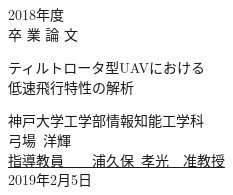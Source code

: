 \newcommand{\hdate}[1]{\setcounter{page}{0}\begin{center}{\LARGE
#1\\}\vskip 20pt {\Huge 卒 業 論 文}\end{center}\vskip 40pt}

\newcommand{\htitle}[1]{
        \begin{center}
                \vskip 16pt
                {\LARGE #1}\\
                \setlength{\unitlength}{1mm}
        \end{center}
        \vskip 40pt
}

\begin{titlepage}
\vspace*{2cm}
\hdate{2018年度}
\htitle{ティルトロータ型UAVにおける\\低速飛行特性の解析}

\hspace{8cm}
\begin{center}
\Large
神戸大学工学部情報知能工学科\\
\vskip 20pt
弓場~洋輝\\
\vskip 40pt
\underline{指導教員~~~~{\Large 浦久保~孝光~~准教授}}\\
\vskip 20pt
2019年2月5日
\end{center}
\end{titlepage}
